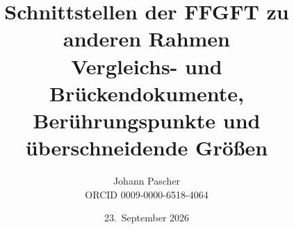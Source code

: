\documentclass[11pt,a4paper]{report}
\title{Schnittstellen der FFGFT zu anderen Rahmen\\[0.5em]\large Vergleichs- und Brückendokumente, Berührungspunkte und überschneidende Größen}
\date{23.~September 2026}
\author{Johann Pascher\\\small ORCID 0009-0000-6518-4064}
\begin{document}
\renewcommand{\thechapter}{}
\renewcommand{\thesection}{\arabic{section}}
\maketitle
\tableofcontents

\end{document}
